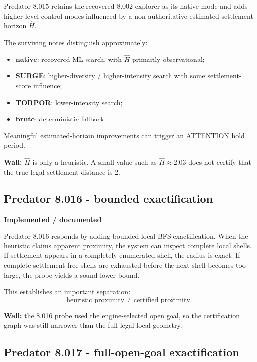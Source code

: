 \documentclass[11pt]{article}
\newcommand{\implemented}{\textbf{Implemented / documented}}
\newcommand{\Hhat}{\widehat{H}}
\begin{document}
Predator 8.015 retains the recovered 8.002 explorer as its native mode and adds higher-level control modes influenced by a non-authoritative estimated settlement horizon $\Hhat$.

The surviving notes distinguish approximately:
\begin{itemize}
\item \textbf{native}: recovered ML search, with $\Hhat$ primarily observational;
\item \textbf{SURGE}: higher-diversity / higher-intensity search with some settlement-score influence;
\item \textbf{TORPOR}: lower-intensity search;
\item \textbf{brute}: deterministic fallback.
\end{itemize}

Meaningful estimated-horizon improvements can trigger an ATTENTION hold period.

\textbf{Wall:} $\Hhat$ is only a heuristic. A small value such as $\Hhat\approx2.03$ does not certify that the true legal settlement distance is 2.

\subsection{Predator 8.016 - bounded exactification}

\begin{statusbox}\implemented\end{statusbox}

Predator 8.016 responds by adding bounded local BFS exactification. When the heuristic claims apparent proximity, the system can inspect complete local shells. If settlement appears in a completely enumerated shell, the radius is exact. If complete settlement-free shells are exhausted before the next shell becomes too large, the probe yields a sound lower bound.

This establishes an important separation:
\[
\boxed{\text{heuristic proximity}}\neq\boxed{\text{certified proximity}}.
\]

\textbf{Wall:} the 8.016 probe used the engine-selected open goal, so the certification graph was still narrower than the full legal local geometry.

\subsection{Predator 8.017 - full-open-goal exactification}
\end{document}
